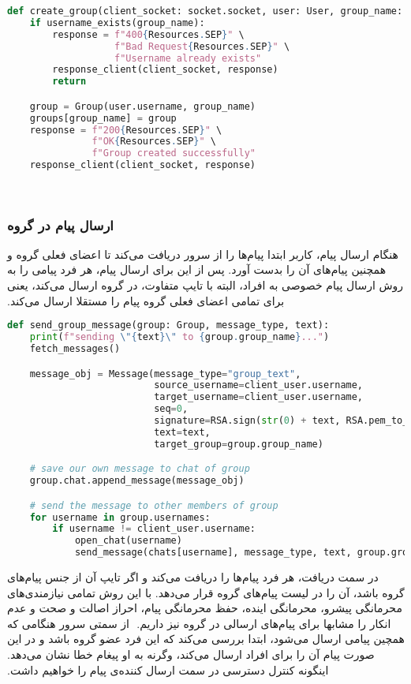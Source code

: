 \begin{latin}
\begin{lstlisting}[firstnumber=234, language=Python]
def create_group(client_socket: socket.socket, user: User, group_name: str):
    if username_exists(group_name):
        response = f"400{Resources.SEP}" \
                   f"Bad Request{Resources.SEP}" \
                   f"Username already exists"
        response_client(client_socket, response)
        return

    group = Group(user.username, group_name)
    groups[group_name] = group
    response = f"200{Resources.SEP}" \
               f"OK{Resources.SEP}" \
               f"Group created successfully"
    response_client(client_socket, response)
\end{lstlisting}
\end{latin}
‫
‫\subsubsection{ارسال پیام در گروه}
‫هنگام ارسال پیام، کاربر ابتدا پیام‌ها را از سرور دریافت می‌کند تا اعضای فعلی گروه و همچنین پیام‌های آن را بدست آورد. پس از این برای ارسال پیام، هر فرد پیامی را به روش ارسال پیام خصوصی به افراد، البته با تایپ متفاوت، در گروه ارسال می‌کند، یعنی برای تمامی اعضای فعلی گروه پیام را مستقلا ارسال می‌کند.
‫

\begin{latin}
\begin{lstlisting}[firstnumber=361, language=Python]
def send_group_message(group: Group, message_type, text):
    print(f"sending \"{text}\" to {group.group_name}...")
    fetch_messages()

    message_obj = Message(message_type="group_text",
                          source_username=client_user.username,
                          target_username=client_user.username,
                          seq=0,
                          signature=RSA.sign(str(0) + text, RSA.pem_to_private_key(client_user.rsa_pr)),
                          text=text,
                          target_group=group.group_name)

    # save our own message to chat of group
    group.chat.append_message(message_obj)

    # send the message to other members of group
    for username in group.usernames:
        if username != client_user.username:
            open_chat(username)
            send_message(chats[username], message_type, text, group.group_name)

\end{lstlisting}
\end{latin}
‫
‫در سمت دریافت، هر فرد پیام‌ها را دریافت می‌کند و اگر تایپ آن از جنس پیام‌های گروه باشد، آن را در لیست پیام‌های گروه قرار می‌دهد. با این روش تمامی نیازمندی‌های محرمانگی پیشرو، محرمانگی اینده، حفظ محرمانگی پیام، احراز اصالت و صحت و عدم انکار را مشابها برای پیام‌های ارسالی در گروه نیز داریم.
‫
‫از سمتی سرور هنگامی که همچین پیامی ارسال می‌شود، ابتدا بررسی می‌کند که این فرد عضو گروه باشد و در این صورت پیام آن را برای افراد ارسال می‌کند، وگرنه به او پیغام خطا نشان می‌دهد. اینگونه کنترل دسترسی در سمت ارسال کننده‌ی پیام را خواهیم داشت.
‫

